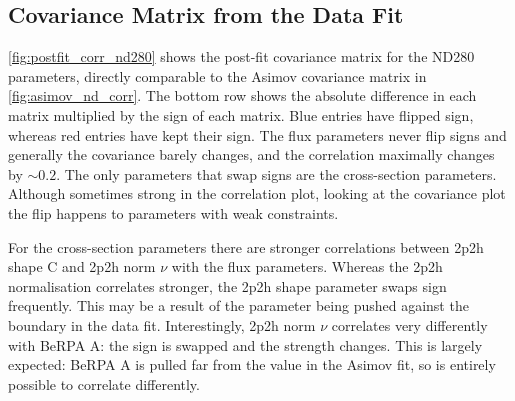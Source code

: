 \subsection{Covariance Matrix from the Data Fit}
\label{sec:covariance_data}
\autoref{fig:postfit_corr_nd280} shows the post-fit covariance matrix for the ND280 parameters, directly comparable to the Asimov covariance matrix in \autoref{fig:asimov_nd_corr}. The bottom row shows the absolute difference in each matrix multiplied by the sign of each matrix. Blue entries have flipped sign, whereas red entries have kept their sign. The flux parameters never flip signs and generally the covariance barely changes, and the correlation maximally changes by $\sim0.2$. The only parameters that swap signs are the cross-section parameters. Although sometimes strong in the correlation plot, looking at the covariance plot the flip happens to parameters with weak constraints.

For the cross-section parameters there are stronger correlations between 2p2h shape C and 2p2h norm $\nu$ with the flux parameters. Whereas the 2p2h normalisation correlates stronger, the 2p2h shape parameter swaps sign frequently. This may be a result of the parameter being pushed against the boundary in the data fit. Interestingly, 2p2h norm $\nu$ correlates very differently with BeRPA A: the sign is swapped and the strength changes. This is largely expected: BeRPA A is pulled far from the value in the Asimov fit, so is entirely possible to correlate differently.

